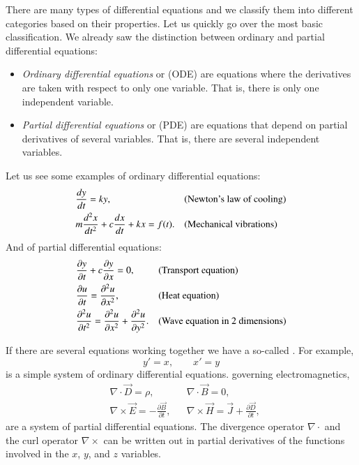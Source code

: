 There are many types of differential equations and we classify them into
different categories based on their properties.  Let us quickly go over
the most basic classification.  We already saw the distinction
between ordinary and partial differential equations:
\begin{itemize}
\item
\emph{Ordinary differential equations}
 or (ODE) are
equations where the derivatives are taken with respect to only one variable.
That is, there is only one independent variable.
\item
\emph{Partial differential equations}
 or (PDE) are
equations that depend on partial derivatives of several variables.
That is, there are several independent variables.
\end{itemize}

Let us see some examples of ordinary differential equations:
\begin{align*}
& \frac{d y}{dt} = ky , & & \text{(\myindex{Newton's law of cooling})} \\
& m \frac{d^2 x}{dt^2} + c \frac{dx}{dt} + kx = f(t) . & &
\text{(\myindex{Mechanical vibrations})}
\end{align*}
And of partial differential equations:
\begin{align*}
& \frac{\partial y}{\partial t} + c \frac{\partial y}{\partial x} = 0 , & & 
\text{(\myindex{Transport equation})} \\
& \frac{\partial u}{\partial t} = \frac{\partial^2 u}{\partial x^2} , & & 
\text{(\myindex{Heat equation})} \\
& \frac{\partial^2 u}{\partial t^2} = \frac{\partial^2 u}{\partial x^2} +
\frac{\partial^2 u}{\partial y^2} . & & 
\text{(\myindex{Wave equation in 2 dimensions})}
\end{align*}

If there are several equations working together we have a so-called
\emph{}.  For example,
\begin{equation*}
y' = x , \qquad x' = y
\end{equation*}
is a simple system of ordinary differential equations.
 governing electromagnetics,
\begin{align*}
& \nabla \cdot \vec{D} = \rho, & & \nabla \cdot \vec{B} = 0 , \\
& \nabla \times \vec{E} = - \frac{\partial \vec{B}}{\partial t}, &
& \nabla \times \vec{H} = \vec{J} + \frac{\partial \vec{D}}{\partial t} ,
\end{align*}
are a system of partial differential equations. 
The divergence operator $\nabla \cdot$ and the
curl operator $\nabla \times$ can be written out in partial derivatives of
the functions involved in the $x$, $y$, and $z$ variables.

